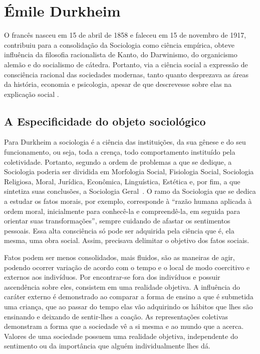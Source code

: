 \newpage
\section{Émile Durkheim}\label{durkheim}

O francês nasceu em 15 de abril de 1858 e faleceu em 15 de novembro de 1917, contribuiu para a consolidação da Sociologia como ciência empírica, obteve influência da filosofia racionalista de Kanto, do Darwinismo, do organicismo alemão e do socialismo de cátedra.
Portanto, via a ciência social a expressão de consciência racional das sociedades modernas, tanto quanto desprezava as áreas da história, economia e psicologia, apesar de que descrevesse sobre elas na explicação social \cite{quintaneiro2003toque}.


\subsection{A Especificidade do objeto sociológico}

Para Durkheim a sociologia é a ciência das instituições, da sua gênese e do seu funcionamento, ou seja, toda a crença, todo comportamento instituído pela coletividade. 
Portanto, segundo a ordem de problemas a que se dedique, a Sociologia poderia ser dividida em Morfologia Social, Fisiologia Social, Sociologia Religiosa, Moral, Jurídica, Econômica, Linguística, Estética e, por fim, a que sintetiza suas conclusões, a Sociologia Geral~\cite{quintaneiro2003toque}. 
O ramo da Sociologia que se dedica a estudar os fatos morais, por exemplo, corresponde à “razão humana aplicada à ordem moral, inicialmente para conhecê-la e compreendê-la, em seguida para orientar suas transformações”, sempre cuidando de afastar os sentimentos pessoais. 
Essa alta consciência só pode ser adquirida pela ciência que é, ela mesma, uma obra social.
Assim, precisava delimitar o objetivo dos fatos sociais.

Fatos podem ser menos consolidados, mais fluidos, são as maneiras de agir, podendo ocorrer variação de acordo com o tempo e o local de modo coercitivo e externos aos indivíduos.
Por encontrar-se fora dos indivíduos e possuir ascendência sobre eles, consistem em uma realidade objetiva.
A influência do caráter externo é demonstrado ao comparar a forma de ensino a que é submetida uma criança, que ao passar do tempo elas vão adquirindo os hábitos que lhes são ensinando e deixando de sentir-lhes a coação. 
As representações coletivas demonstram a forma que a sociedade vê a si mesma e ao mundo que a acerca.
Valores de uma sociedade possuem uma realidade objetiva, independente do sentimento ou da importância que alguém individualmente lhes dá.


